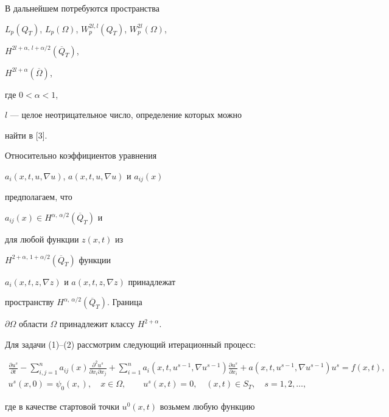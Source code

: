 В дальнейшем потребуются пространства


$L_p(Q_T)$, $L_p(\Omega)$, $W^{2l,l}_p(Q_T)$, $W^{2l}_p(\Omega)$,


$H^{2l+\alpha,\,l+\alpha/2}(\overline Q_T)$,


$H^{2l+\alpha}(\overline \Omega)$,


где $0<\alpha<1$,


$l$ --- целое неотрицательное число, определение которых можно


найти в [3].





Относительно коэффициентов уравнения


$a_i(x,t,u,\nabla u)$, $a(x,t,u,\nabla u)$ и $a_{ij}(x)$


предполагаем, что


$a_{ij}(x)\in H^{\alpha,\,\alpha/2}(\overline Q_T)$ и


для любой функции $z(x,t)$ из


$H^{2+\alpha,\,1+\alpha/2}(\overline Q_T)$ функции


$a_i(x,t,z,\nabla z)$ и $a(x,t,z,\nabla z)$ принадлежат


пространству $H^{\alpha,\,\alpha/2}(\overline Q_T)$. Граница


$\partial\Omega$ области $\Omega$ принадлежит классу $H^{2+\alpha}$.





Для задачи (1)--(2) рассмотрим следующий итерационный процесс:


\begin{gather}


\frac{\partial u^s}{\partial t}-\sum^n_{i,j=1}a_{ij}(x)


\frac{\partial^2u^s}{\partial x_i\partial x_j}


+\sum^n_{i=1}a_i(x,t,u^{s-1},\nabla u^{s-1})


\frac{\partial u^s}{\partial x_i}+a(x,t,u^{s-1},\nabla


u^{s-1})u^s=f(x,t),\\


u^s(x,0)=\psi_0(x,),\quad x\in\Omega,\qquad


u^s(x,t)=0,\quad (x,t)\in S_T,\quad s=1,2,\dotsc,


\end{gather}


где в качестве стартовой точки $u^0(x,t)$ возьмем любую функцию


